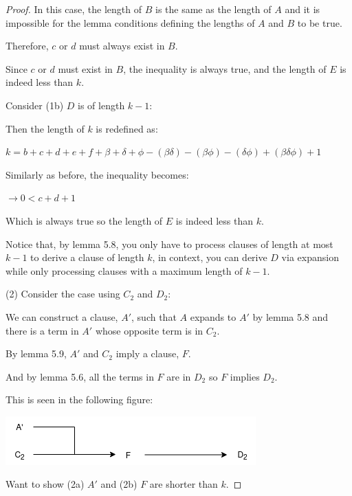 \documentclass[manuscript]{acmart}
\begin{document}
\begin{proof}
        In this case, the length of $B$ is the same as the length of $A$ and 
        it is impossible for the lemma conditions defining the lengths
        of $A$ and $B$ to be true.

        Therefore, $c$ or $d$ must always exist in $B$.

        Since $c$ or $d$ must exist in $B$, the inequality is always true, 
        and the length of $E$ is indeed less than $k$.

        Consider (1b) $D$ is of length $k - 1$:

        Then the length of $k$ is redefined as:

        $k = b + c + d + e + f + \beta + \delta + \phi - (\beta \delta) 
        - (\beta \phi) - (\delta \phi) + (\beta \delta \phi) + 1$

        Similarly as before, the inequality becomes:

        $\rightarrow 0 < c + d + 1$

        Which is always true so the length of $E$ is indeed less than $k$.

        Notice that, by lemma 5.8, you only have to process clauses of length
        at most $k-1$ to derive a clause of length $k$, in context, you 
        can derive $D$ via expansion while only processing clauses with
        a maximum length of $k-1$.


        (2) Consider the case using $C_2$ and $D_2$:

        We can construct a clause, $A'$, such that $A$ expands to $A'$ by 
        lemma 5.8 and there is a term in $A'$ whose opposite term is in $C_2$.

        By lemma 5.9, $A'$ and $C_2$ imply a clause, $F$.

        And by lemma 5.6, all the terms in $F$ are in $D_2$ so $F$ implies $D_2$.

        This is seen in the following figure:

        \includegraphics[scale=0.8]{318c.png}
        
        Want to show (2a) $A'$ and (2b) $F$ are shorter than $k$.


\end{proof}
\end{document}
